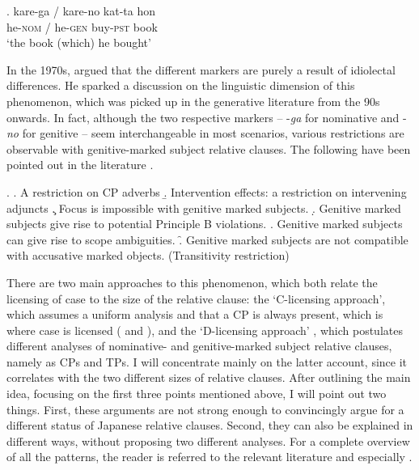 \exg. kare-ga / kare-no kat-ta hon\\
he-\textsc{nom} / he-\textsc{gen} buy-\textsc{pst} book\\
`the book (which) he bought' \label{no-ga}

In the 1970s, \citet{harada:1971:ga} argued that the different markers are purely a result of idiolectal differences. He sparked a discussion on the linguistic dimension of this phenomenon, which was picked up in the generative literature from the 90s onwards. In fact, although the two respective markers -- -\textit{ga} for nominative and -\textit{no} for genitive -- seem interchangeable in most scenarios, various restrictions are observable with genitive-marked subject relative clauses. The following have been pointed out in the literature \citep{watanabe:1996:nominative, hiraiwa:2001:on, miyagawa:2011:genitive, miyagawa:2012:case, miyagawa:2017:agreement, ochi:2004:ga, ochi:2017:ga, ochi:2021:feature, akaso:2011:on, nambu:2014:an, nambu:2023:experimental}.

\ex. \a. A restriction on CP adverbs
\b. Intervention effects: a restriction on intervening adjuncts
\c. Focus is impossible with genitive marked subjects.
\d. Genitive marked subjects give rise to potential Principle B violations.
\e. Genitive marked subjects can give rise to scope ambiguities.
\f. Genitive marked subjects are not compatible with accusative marked objects. (Transitivity restriction)

There are two main approaches to this phenomenon, which both relate the licensing of case to the size of the relative clause: the `C-licensing approach’, which assumes a uniform analysis and that a CP is always present, which is where case is licensed (\citealt{watanabe:1996:nominative} and \citealt{hiraiwa:2001:multiple, hiraiwa:2001:on}), and the `D-licensing approach' \citep{miyagawa:2011:genitive, miyagawa:2012:case, miyagawa:2017:agreement}, which postulates different analyses of nominative- and genitive-marked subject relative clauses, namely as CPs and TPs. I will concentrate mainly on the latter account, since it correlates with the two different sizes of relative clauses. After outlining the main idea, focusing on the first three points mentioned above, I will point out two things. First, these arguments are not strong enough to convincingly argue for a different status of Japanese relative clauses. Second, they can also be explained in different ways, without proposing two different analyses. For a complete overview of all the patterns, the reader is referred to the relevant literature and especially \citet{ochi:2017:ga}.

